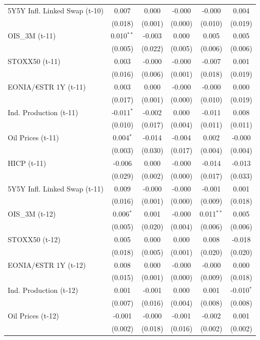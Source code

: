 \begin{longtable}[t]{lccccc}
5Y5Y Infl. Linked Swap (t-10) & 0.007 & 0.000 & -0.000 & -0.000 & 0.004\\
 & (0.018) & (0.001) & (0.000) & (0.010) & (0.019)\\
OIS\_3M (t-11) & 0.010$^{**}$ & -0.003 & 0.000 & 0.005 & 0.005\\
 & (0.005) & (0.022) & (0.005) & (0.006) & (0.006)\\
STOXX50 (t-11) & 0.003 & -0.000 & -0.000 & -0.007 & 0.001\\
 & (0.016) & (0.006) & (0.001) & (0.018) & (0.019)\\
EONIA/€STR 1Y (t-11) & 0.003 & 0.000 & -0.000 & -0.000 & 0.000\\
 & (0.017) & (0.001) & (0.000) & (0.010) & (0.019)\\
Ind. Production (t-11) & -0.011$^{*}$ & -0.002 & 0.000 & -0.011 & 0.008\\
 & (0.010) & (0.017) & (0.004) & (0.011) & (0.011)\\
Oil Prices (t-11) & 0.004$^{*}$ & -0.014 & -0.004 & 0.002 & -0.000\\
 & (0.003) & (0.030) & (0.017) & (0.004) & (0.004)\\
HICP (t-11) & -0.006 & 0.000 & -0.000 & -0.014 & -0.013\\
 & (0.029) & (0.002) & (0.000) & (0.017) & (0.033)\\
5Y5Y Infl. Linked Swap (t-11) & 0.009 & -0.000 & -0.000 & -0.001 & 0.001\\
 & (0.016) & (0.001) & (0.000) & (0.009) & (0.018)\\
OIS\_3M (t-12) & 0.006$^{*}$ & 0.001 & -0.000 & 0.011$^{**}$ & 0.005\\
 & (0.005) & (0.020) & (0.004) & (0.006) & (0.006)\\
STOXX50 (t-12) & 0.005 & 0.000 & 0.000 & 0.008 & -0.018\\
 & (0.018) & (0.005) & (0.001) & (0.020) & (0.020)\\
EONIA/€STR 1Y (t-12) & 0.008 & 0.000 & -0.000 & -0.000 & 0.000\\
 & (0.015) & (0.001) & (0.000) & (0.009) & (0.018)\\
Ind. Production (t-12) & 0.001 & -0.001 & 0.000 & 0.001 & -0.010$^{*}$\\
 & (0.007) & (0.016) & (0.004) & (0.008) & (0.008)\\
Oil Prices (t-12) & -0.001 & -0.000 & -0.001 & -0.002 & 0.001\\
 & (0.002) & (0.018) & (0.016) & (0.002) & (0.002)\\

\end{longtable}
